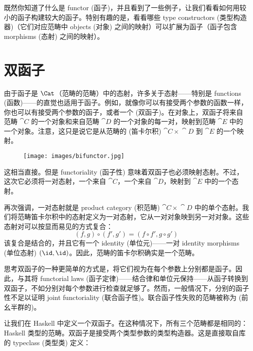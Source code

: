 
\lettrine[lhang=0.17]{既}{然你知道了}什么是 functor (函子)，并且看到了一些例子，让我们看看如何用较小的函子构建较大的函子。特别有趣的是，看看哪些 type constructors (类型构造器)（它们对应范畴中 objects (对象) 之间的映射）可以扩展为函子（函子包含 morphisms (态射) 之间的映射）。

\section{双函子}

由于函子是 $\Cat$（范畴的范畴）中的态射，许多关于态射——特别是 functions (函数)——的直觉也适用于函子。例如，就像你可以有接受两个参数的函数一样，你也可以有接受两个参数的函子，或者一个  (双函子)。在对象上，双函子将来自范畴 $\cat{C}$ 的一个对象和来自范畴 $\cat{D}$ 的一个对象的每一对，映射到范畴 $\cat{E}$ 中的一个对象。注意，这只是说它是从范畴的  (笛卡尔积) $\cat{C}\times{}\cat{D}$ 到 $\cat{E}$ 的一个映射。

\begin{figure}[H]
  \centering\texttt{[image: images/bifunctor.jpg]}
\end{figure}

\noindent
这相当直接。但是 functoriality (函子性) 意味着双函子也必须映射态射。不过，这次它必须将一对态射，一个来自 $\cat{C}$，一个来自 $\cat{D}$，映射到 $\cat{E}$ 中的一个态射。

再次强调，一对态射就是 product category (积范畴) $\cat{C}\times{}\cat{D}$ 中的单个态射。我们将范畴笛卡尔积中的态射定义为一对态射，它从一对对象映到另一对对象。这些态射对可以按显而易见的方式复合：
\[(f, g) \circ (f', g') = (f \circ f', g \circ g')\]
该复合是结合的，并且它有一个 identity (单位元)——一对 identity morphisms (单位态射) $(\id, \id)$。因此，范畴的笛卡尔积确实是一个范畴。

思考双函子的一种更简单的方式是，将它们视为在每个参数上分别都是函子。因此，与其将 functorial laws (函子定律)——结合律和单位元保持——从函子转换到双函子，不如分别对每个参数进行检查就足够了。然而，一般情况下，分别的函子性不足以证明 joint functoriality (联合函子性)。联合函子性失败的范畴被称为  (前幺半群的)。

让我们在 Haskell 中定义一个双函子。在这种情况下，所有三个范畴都是相同的：Haskell 类型的范畴。双函子是接受两个类型参数的类型构造器。这是直接取自库  的  typeclass (类型类) 定义：


